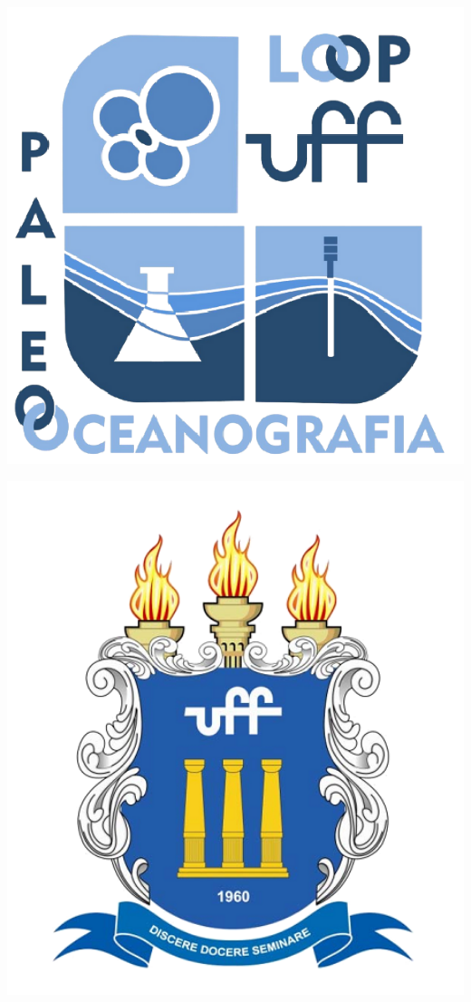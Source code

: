 \documentclass[11pt]{article}
\begin{document}
\begin{titlepage}
\centering
 \begin{minipage}[b]{0.3\textwidth}
  \includegraphics[width=\textwidth]{figures/loop.png} %
\end{minipage}%
\hfill %
\begin{minipage}[b]{0.3\textwidth}
  \centering
  \includegraphics[width=1\textwidth]{figures/logo.png} %

\end{minipage}
\end{titlepage}
\end{document}
